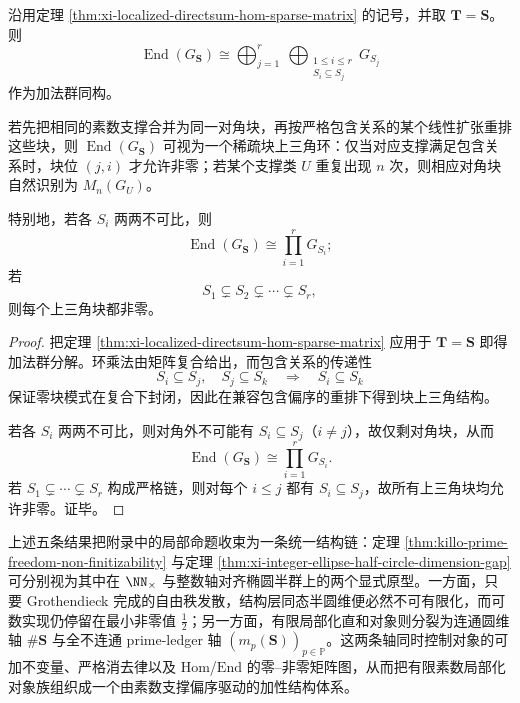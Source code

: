 \begin{corollary}[局部化直和对象族的端同态环由素数支撑偏序支配]\label{cor:xi-localized-directsum-end-ring-poset}
沿用定理 \ref{thm:xi-localized-directsum-hom-sparse-matrix} 的记号，并取 \(\mathbf T=\mathbf S\)。则
\[
\operatorname{End}(G_{\mathbf S})
\cong
\bigoplus_{j=1}^{r}\ \bigoplus_{\substack{1\le i\le r\\ S_i\subseteq S_j}} G_{S_j}
\]
作为加法群同构。

若先把相同的素数支撑合并为同一对角块，再按严格包含关系的某个线性扩张重排这些块，则 \(\operatorname{End}(G_{\mathbf S})\) 可视为一个稀疏块上三角环：仅当对应支撑满足包含关系时，块位 \((j,i)\) 才允许非零；若某个支撑类 \(U\) 重复出现 \(n\) 次，则相应对角块自然识别为 \(M_n(G_U)\)。

特别地，若各 \(S_i\) 两两不可比，则
\[
\operatorname{End}(G_{\mathbf S})\cong \prod_{i=1}^{r}G_{S_i};
\]
若
\[
S_1\subsetneq S_2\subsetneq \cdots \subsetneq S_r,
\]
则每个上三角块都非零。
\end{corollary}
\begin{proof}
把定理 \ref{thm:xi-localized-directsum-hom-sparse-matrix} 应用于 \(\mathbf T=\mathbf S\) 即得加法群分解。环乘法由矩阵复合给出，而包含关系的传递性
\[
S_i\subseteq S_j,\quad S_j\subseteq S_k
\quad\Longrightarrow\quad
S_i\subseteq S_k
\]
保证零块模式在复合下封闭，因此在兼容包含偏序的重排下得到块上三角结构。

若各 \(S_i\) 两两不可比，则对角外不可能有 \(S_i\subseteq S_j\)（\(i\neq j\)），故仅剩对角块，从而
\[
\operatorname{End}(G_{\mathbf S})\cong \prod_{i=1}^{r}G_{S_i}.
\]
若 \(S_1\subsetneq \cdots \subsetneq S_r\) 构成严格链，则对每个 \(i\le j\) 都有 \(S_i\subseteq S_j\)，故所有上三角块均允许非零。证毕。
\end{proof}

\noindent
上述五条结果把附录中的局部命题收束为一条统一结构链：定理 \ref{thm:killo-prime-freedom-non-finitizability} 与定理 \ref{thm:xi-integer-ellipse-half-circle-dimension-gap} 可分别视为其中在 \(\NN_{\times}\) 与整数轴对齐椭圆半群上的两个显式原型。一方面，只要 Grothendieck 完成的自由秩发散，结构层同态半圆维便必然不可有限化，而可数实现仍停留在最小非零值 \(\frac12\)；另一方面，有限局部化直和对象则分裂为连通圆维轴 \(\#\mathbf S\) 与全不连通 prime-ledger 轴 \((m_p(\mathbf S))_{p\in\mathbb P}\)。这两条轴同时控制对象的可加不变量、严格消去律以及 \(\mathrm{Hom}\)/\(\mathrm{End}\) 的零--非零矩阵图，从而把有限素数局部化对象族组织成一个由素数支撑偏序驱动的加性结构体系。

\endinput
